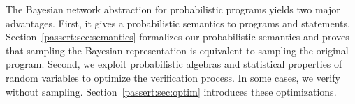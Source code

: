 

The Bayesian network abstraction for probabilistic programs yields two major
advantages.
First, it gives a probabilistic semantics to programs and \passert
statements.
Section~\ref{passert:sec:semantics} formalizes our probabilistic semantics and proves that
sampling the Bayesian representation is equivalent to sampling the original
program.
Second, we exploit 
probabilistic algebras and statistical properties of random variables to optimize the
verification process. In some cases, we verify \passerts without sampling.
Section~\ref{passert:sec:optim} introduces these 
optimizations.


